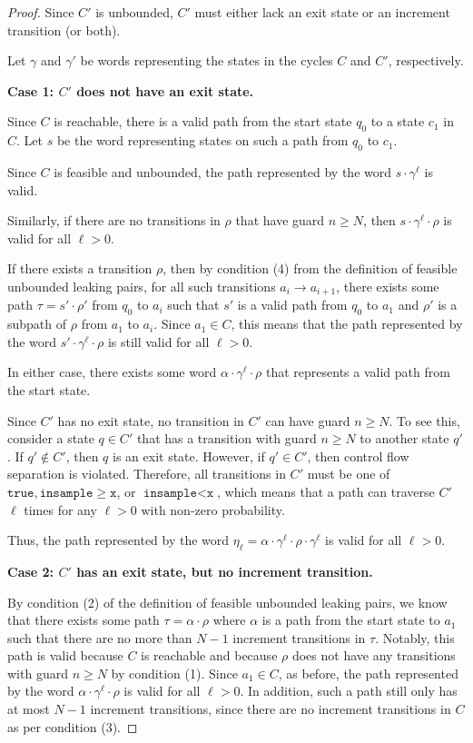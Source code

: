 \documentclass[12pt]{article}
\newcommand{\gguard}{\texttt{insample}\geq \texttt{x}}
\newcommand{\lguard}{\texttt{insample} < \texttt{x}}
\theoremstyle{definition}
\begin{document}
\begin{proof}
	Since $C'$ is unbounded, $C'$ must either lack an exit state or an increment transition (or both). 


	Let $\gamma$ and $\gamma'$ be words representing the states in the cycles $C$ and $C'$, respectively. 


	\textbf{Case 1: $C'$ does not have an exit state.}

	Since $C$ is reachable, there is a valid path from the start state 
	$q_0$ to a state $c_1$ in $C$. Let $s$ be the word representing states on such a path from $q_0$ to $c_1$. 


	Since $C$ is feasible and unbounded, the path represented by the word $s\cdot \gamma^\ell$ is valid. 

	Similarly, if there are no transitions in $\rho$ that have guard $n\geq N$, then $s\cdot \gamma^\ell\cdot \rho$ is valid for all $\ell > 0$. 
	
	If there exists a transition $\rho$, then by condition (4) from the definition of feasible unbounded leaking pairs, for all such transitions $a_i\to a_{i+1}$, there exists some path $\tau = s' \cdot \rho'$ from $q_0$ to $a_i$ such that $s'$ is a valid path from $q_0$ to $a_1$ and $\rho'$ is a subpath of $\rho$ from $a_1$ to $a_i$. Since $a_1\in C$, this means that the path represented by the word $s' \cdot \gamma^\ell \cdot \rho$ is still valid for all $\ell > 0$. 

	In either case, there exists some word $\alpha \cdot \gamma^\ell \cdot \rho$ that represents a valid path from the start state. 

	Since $C'$ has no exit state, no transition in $C'$ can have guard $n \geq N$. To see this, consider a state $q\in C'$ that has a transition with guard $n \geq N$ to another state $q'$. If $q'\notin C'$, then $q$ is an exit state. However, if $q'\in C'$, then control flow separation is violated. 
	Therefore, all transitions in $C'$ must be one of $\texttt{true}, \gguard$, or $\lguard$, which means that a path can traverse $C'$ $\ell$ times for any $\ell > 0$ with non-zero probability. 

	Thus, the path represented by the word $\eta_\ell = \alpha \cdot \gamma^\ell \cdot \rho\cdot \gamma^\ell$ is valid for all $\ell > 0$.

	\textbf{Case 2: $C'$ has an exit state, but no increment transition.}

	By condition (2) of the definition of feasible unbounded leaking pairs, we know that there exists some path $\tau = \alpha \cdot \rho$ where $\alpha$ is a path from the start state to $a_1$ such that there are no more than $N-1$ increment transitions in $\tau$. Notably, this path is valid because $C$ is reachable and because $\rho$ does not have any transitions with guard $n\geq N$ by condition (1). 
	Since $a_1 \in C$, as before, the path represented by the word $\alpha \cdot \gamma^\ell \cdot \rho$ is valid for all $\ell > 0$. In addition, such a path still only has at most $N-1$ increment transitions, since there are no increment transitions in $C$ as per condition (3). 


\end{proof}
\end{document}
